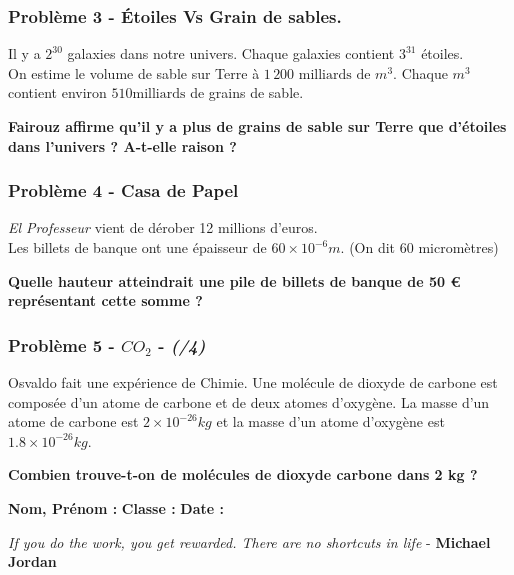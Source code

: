 \Pointilles[4]

\subsubsection*{Problème 3 - Étoiles Vs Grain de sables.}

Il y a $2^{30}$ galaxies dans notre univers. Chaque galaxies contient $3^{31}$ étoiles.  \\
On estime le volume de sable sur Terre à $1\,200 \text{ milliards de } m^3$. Chaque $m^3$ contient environ $510 \text{milliards}$ de grains de sable. 

\textbf{Fairouz affirme qu'il y a plus de grains de sable sur Terre que d'étoiles dans l'univers ? A-t-elle raison ?}

\Pointilles[4]

\subsubsection*{Problème 4 - Casa de Papel}

\textit{\og El Professeur \fg{} } vient de dérober 12 millions d’euros. \\
Les billets de banque ont une épaisseur de $60 \times 10^{-6} m$. (On dit 60 micromètres)

\textbf{Quelle hauteur atteindrait une pile de billets de banque de 50 \euro{} représentant cette somme ?}

\Pointilles[5]

\subsubsection*{Problème 5 - $CO_2$  - \textit{(/4)}}

Osvaldo fait une expérience de Chimie. Une molécule de dioxyde de carbone est composée d'un atome de carbone et de deux atomes d'oxygène. La masse d'un atome de carbone est $2 \times 10^{-26}kg$ et la masse d'un atome d'oxygène est $1.8 \times 10^{-26}kg$. 

\textbf{Combien trouve-t-on de molécules de dioxyde carbone dans 2 kg ?}

\Pointilles[5]

\newpage


\textbf{Nom, Prénom :} \hspace{8cm} \textbf{Classe :} \hspace{3cm} \textbf{Date :}\\

\begin{center}
  \textit{If you do the work, you get rewarded. There are no shortcuts in life}  - \textbf{Michael Jordan}
\end{center}

